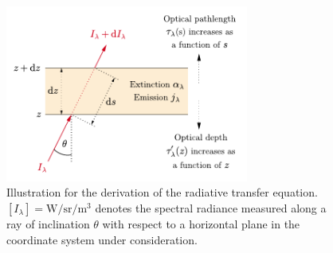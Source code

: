 \documentclass[a4paper,12pt]{report}
\begin{document}
\begin{figure}[h!]
\centering
\includegraphics[width=8cm]{figures/radiative-transfer-equation.pdf}
\caption{Illustration for the derivation of the radiative transfer equation. $[I_\lambda] = \si{\watt\per\steradian\per\cubic\meter}$ denotes the spectral radiance measured along a ray of inclination $\theta$ with respect to a horizontal plane in the coordinate system under consideration.}
\label{fig:radiative-transfer-equation}
\end{figure}
\end{document}
